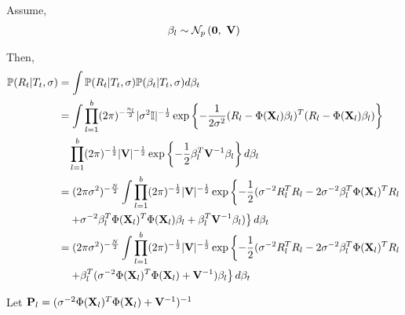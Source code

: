 Assume,
$$
\begin{aligned}
    \beta_{l} & \sim \mathcal{N}_{p}\left(\mathbf{0},~\mathbf{V}\right) \\
\end{aligned}
$$

Then,
$$
\begin{aligned}
    \mathbb{P}(R_{t} \vert T_{t}, \sigma) & = \int \mathbb{P}(R_{t} \vert T_{t}, \sigma) \mathbb{P}(\beta_{t} \vert T_{t}, \sigma) d\beta_{t} \\
    & = \int \prod_{l = 1}^{b} (2 \pi)^{-\frac{n_l}{2}} |\sigma^2 \mathbb{I}|^{-\frac{1}{2}} \exp \left\{-\frac{1}{2 \sigma^2} (R_{l} - \Phi(\mathbf{X}_l) \beta_{l})^{T} (R_{l} - \Phi(\mathbf{X}_l) \beta_{l}) \right\}\\
    & \quad \prod_{l = 1}^{b} (2 \pi)^{-\frac{1}{2}} |\mathbf{V}|^{-\frac{1}{2}} \exp \left\{-\frac{1}{2} \beta_{l}^{T} \mathbf{V}^{-1} \beta_{l} \right\} d\beta_{l} \\
    & = (2 \pi \sigma^2)^{-\frac{N}{2}} \int \prod_{l = 1}^{b} (2 \pi)^{-\frac{1}{2}} |\mathbf{V}|^{-\frac{1}{2}} \exp \left\{-\frac{1}{2}(\sigma^{-2}R_{l}^{T}R_{l} - 2\sigma^{-2}\beta_{l}^{T}\Phi(\mathbf{X}_l)^{T}R_{l}\right. \\
    & \quad \left. + \sigma^{-2}\beta_{l}^{T}\Phi(\mathbf{X}_l)^{T}\Phi(\mathbf{X}_l)\beta_{l} + \beta_{l}^{T}\mathbf{V}^{-1}\beta_{l}) \right\} d\beta_{t}\\
    & = (2 \pi \sigma^2)^{-\frac{N}{2}} \int \prod_{l = 1}^{b} (2 \pi)^{-\frac{1}{2}} |\mathbf{V}|^{-\frac{1}{2}} \exp \left\{ -\frac{1}{2}(\sigma^{-2}R_{l}^{T}R_{l} - 2\sigma^{-2}\beta_{l}^{T}\Phi(\mathbf{X}_l)^{T}R_{l}\right. \\
    & \quad \left. + \beta_{l}^{T}(\sigma^{-2}\Phi(\mathbf{X}_l)^{T}\Phi(\mathbf{X}_l) + \mathbf{V}^{-1})\beta_{l}\right\} d\beta_{t} \\ 
\end{aligned}
$$

Let $\mathbf{P}_{l} = (\sigma^{-2}\Phi(\mathbf{X}_l)^{T}\Phi(\mathbf{X}_l) + \mathbf{V}^{-1})^{-1}$

